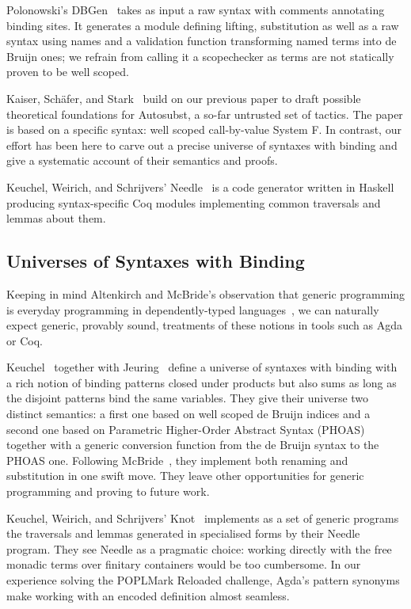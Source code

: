{Polonowski's DBGen~\citeyear{polonowski:db} takes as input a raw syntax with
comments annotating binding sites. It generates a module defining lifting,
substitution as well as a raw syntax using names and a validation function
transforming named terms into de Bruijn ones; we refrain from calling it a
scopechecker as terms are not statically proven to be well scoped.

Kaiser, Schäfer, and Stark~\citeyear{Kaiser-wsdebr} build on our previous paper
to draft possible theoretical foundations for Autosubst, a so-far untrusted
set of tactics. The paper is based on a specific syntax: well scoped call-by-value
System F. In contrast, our effort has been here to carve out
a precise universe of syntaxes with binding and give a systematic account
of their semantics and proofs.

Keuchel, Weirich, and Schrijvers' Needle~\citeyear{needleandknot} is a code
generator written in Haskell producing syntax-specific Coq modules
implementing common traversals and lemmas about them.

\subsection{Universes of Syntaxes with Binding} Keeping in mind Altenkirch
and McBride's observation that generic programming is everyday programming
in dependently-typed languages~\citeyear{DBLP:conf/ifip2-1/AltenkirchM02}, we can naturally
expect generic, provably sound, treatments of these notions in tools such as
Agda or Coq.

Keuchel~\citeyear{Keuchel:Thesis:2011} together with Jeuring~\citeyear{DBLP:conf/icfp/KeuchelJ12}
define a universe of syntaxes with binding with a rich notion of binding patterns
closed under products but also sums as long as the disjoint patterns bind the same
variables. They give their universe two distinct semantics: a first one based on well
scoped de Bruijn indices and a second one based on Parametric Higher-Order Abstract
Syntax (PHOAS)~\cite{DBLP:conf/icfp/Chlipala08} together with a generic conversion
function from the de Bruijn syntax to the PHOAS one. Following McBride~\citeyear{mcbride2005type},
they implement both renaming and substitution in one swift move. They leave other
opportunities for generic programming and proving to future work.

Keuchel, Weirich, and Schrijvers' Knot~\citeyear{needleandknot} implements
as a set of generic programs the traversals and lemmas generated in specialised
forms by their Needle program. They see Needle as a pragmatic choice: working
directly with the free monadic terms over finitary containers would be too cumbersome. In
our experience solving the POPLMark Reloaded challenge, Agda's pattern
synonyms~\cite{Pickering:patsyn} make working with an encoded definition almost
seamless.

}
